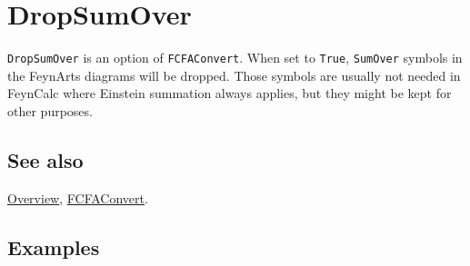 \documentclass[../FeynCalcManual.tex]{subfiles}
\begin{document}
\hypertarget{dropsumover}{
\section{DropSumOver}\label{dropsumover}}

\texttt{DropSumOver} is an option of \texttt{FCFAConvert}. When set to
\texttt{True}, \texttt{SumOver} symbols in the FeynArts diagrams will be
dropped. Those symbols are usually not needed in FeynCalc where Einstein
summation always applies, but they might be kept for other purposes.

\subsection{See also}

\hyperlink{toc}{Overview}, \hyperlink{fcfaconvert}{FCFAConvert}.

\subsection{Examples}
\end{document}
